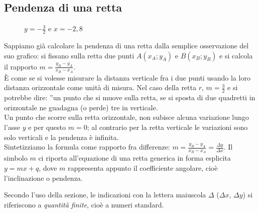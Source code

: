 \subsection{Pendenza di una retta}
\label{subsec:diff01_pendretta}

\begin{figure}[h]
\begin{inaccessibleblock}
 \begin{center}
 \begin{minipage}[]{.31 \textwidth}
  \rettadueterzi
  \caption{$y=\frac{3}{2}x-1$}
 \end{minipage} 
 \begin{minipage}[]{.31 \textwidth}
  \rettamenounquarto
  \caption{$y=-\frac{1}{4}x+\frac{1}{2}$}
 \end{minipage} 
 \begin{minipage}[]{.31 \textwidth}
  \retteorvert
  \caption{$y=-\frac{3}{2}$ e $x=-2,8$}
 \end{minipage}
 \end{center}
\end{inaccessibleblock}
\label{fig:diff01_ret}
\end{figure}


Sappiamo già calcolare la pendenza di una retta dalla semplice osservazione 
del suo grafico: si fissano sulla retta due punti $A(x_A; y_A)$ e $B(x_B; 
y_B)$
e si calcola il rapporto $m=\frac{y_B-y_A}{x_B-x_A}$.\\
È come se si volesse misurare la distanza verticale
fra i due punti usando la loro distanza orizzontale come unità di misura. 
Nel caso della retta $r$, $m=\frac{3}{2}$ e si potrebbe dire: ''un punto 
che 
si 
muove sulla retta, se si sposta di due quadretti in orizzontale
ne guadagna (o perde) tre in verticale.\\
Un punto che scorre sulla retta orizzontale, non subisce
alcuna variazione lungo l'asse $y$ e per questo $m=0$; al contrario per la
retta verticale le variazioni sono solo verticali e la pendenza è
infinita.\\
Sintetizziamo la formula come rapporto fra differenze:
$m=\frac{y_B-y_A}{x_B-x_A}=\frac{\Delta y}{\Delta x}$. Il simbolo $m$ 
ci riporta all'equazione di una retta generica in forma esplicita
$y=mx+q$, dove $m$ rappresenta appunto il coefficiente angolare, cioè 
l'inclinazione o pendenza.
\begin{osservazione}
Secondo l'uso della sezione, le indicazioni con la lettera
maiuscola $\Delta$ ($\Delta x$, $\Delta y$) si riferiscono a \emph{quantità 
finite},
cioè a numeri standard.
\end{osservazione}

